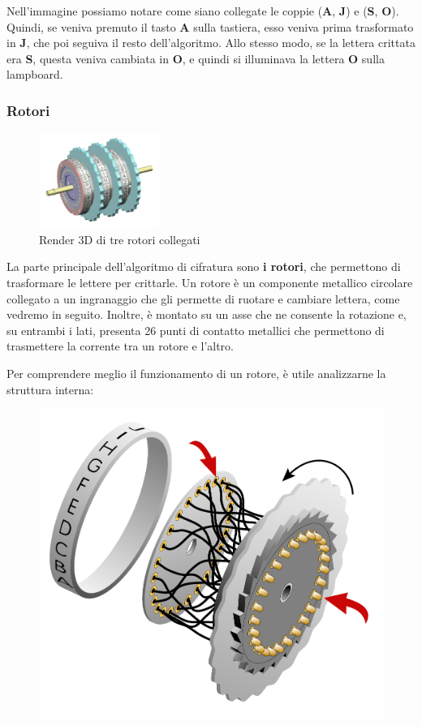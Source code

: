 \documentclass{rapport}
\begin{document}
Nell'immagine possiamo notare come siano collegate le coppie (\textbf{A}, \textbf{J}) e (\textbf{S}, \textbf{O}).  
Quindi, se veniva premuto il tasto \textbf{A} sulla tastiera, esso veniva prima trasformato in \textbf{J}, che poi seguiva il resto dell'algoritmo.  
Allo stesso modo, se la lettera crittata era \textbf{S}, questa veniva cambiata in \textbf{O}, e quindi si illuminava la lettera \textbf{O} sulla lampboard.

\subsubsection{Rotori}

\begin{figure}
    \vspace{-1cm}
    \centering
    \includegraphics[width=0.35\textwidth]{logos/2_4cripto.png}
    \caption*{Render 3D di tre rotori collegati}
\end{figure}

La parte principale dell'algoritmo di cifratura sono \textbf{i rotori}, che permettono di trasformare le lettere per crittarle.  
Un rotore è un componente metallico circolare collegato a un ingranaggio che gli permette di ruotare e cambiare lettera, come vedremo in seguito.  
Inoltre, è montato su un asse che ne consente la rotazione e, su entrambi i lati, presenta 26 punti di contatto metallici che permettono di trasmettere la corrente tra un rotore e l'altro.

\afterpage{\clearpage}   


\newpage
Per comprendere meglio il funzionamento di un rotore, è utile analizzarne la struttura interna:

\begin{figure}[h]
    \centering
    \includegraphics[width=0.6\linewidth]{logos/2_5cripto.pdf}
\end{figure}
\end{document}
